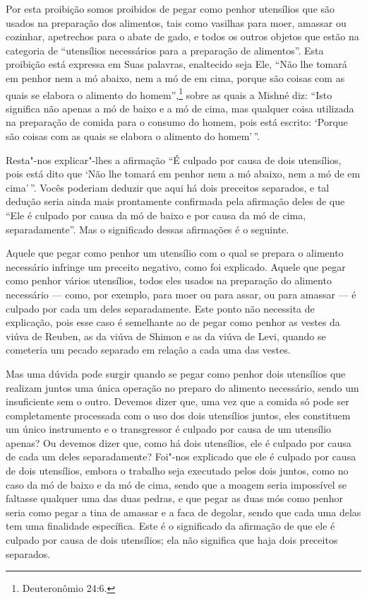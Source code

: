 \begin{multicols}{2}
Por esta proibição somos proibidos de pegar como penhor utensílios que
são usados na preparação dos alimentos, tais como vasilhas para moer,
amassar ou cozinhar, apetrechos para o abate de gado, e todos os outros
objetos que estão na categoria de ``utensílios necessários para a
preparação de alimentos''. Esta proibição está expressa em Suas
palavras, enaltecido seja Ele, ``Não lhe tomará em penhor nem a mó
abaixo, nem a mó de em cima, porque são coisas com as quais se elabora o
alimento do homem'',\footnote{Deuteronômio 24:6.} sobre as quais a Mishné diz:
``Isto significa não apenas a mó de baixo e a mó de cima, mas qualquer
coisa utilizada na preparação de comida para o consumo do homem, pois
está escrito: `Porque são coisas com as quais se elabora o alimento do
homem'\,''.

Resta"-nos explicar"-lhes a afirmação ``É culpado por causa de dois
utensílios, pois está dito que `Não lhe tomará em penhor nem a mó
abaixo, nem a mó de em cima'\,''. Vocês poderiam deduzir que aqui há dois
preceitos separados, e tal dedução seria ainda mais prontamente
confirmada pela afirmação deles de que ``Ele é culpado por causa da mó
de baixo e por causa da mó de cima, separadamente''. Mas o significado
dessas afirmações é o seguinte.

Aquele que pegar como penhor um utensílio com o qual se prepara o
alimento necessário infringe um preceito negativo, como foi explicado.
Aquele que pegar como penhor vários utensílios, todos eles usados na
preparação do alimento necessário --- como, por exemplo, para moer ou
para assar, ou para amassar --- é culpado por cada um deles
separadamente. Este ponto não necessita de explicação, pois esse caso é
semelhante ao de pegar como penhor as vestes da viúva de Reuben, as da
viúva de Shimon e as da viúva de Levi\starr, quando se cometeria um pecado
separado em relação a cada uma das vestes.

Mas uma dúvida pode surgir quando se pegar como penhor dois utensílios
que realizam juntos uma única operação no preparo do alimento
necessário, sendo um insuficiente sem o outro. Devemos dizer que, uma
vez que a comida só pode ser completamente processada com o uso dos
dois utensílios juntos, eles constituem um único instrumento e o
transgressor é culpado por causa de um utensílio apenas? Ou devemos
dizer que, como há dois utensílios, ele é culpado por causa de cada um
deles separadamente? Foi"-nos explicado que ele é culpado por causa de
dois utensílios, embora o trabalho seja executado pelos dois juntos,
como no caso da mó de baixo e da mó de cima, sendo que a moagem seria
impossível se faltasse qualquer uma das duas pedras, e que pegar as
duas mós como penhor seria como pegar a tina de amassar e a faca de
degolar, sendo que cada uma delas tem uma finalidade específica. Este é
o significado da afirmação de que ele é culpado por causa de dois
utensílios; ela não significa que haja dois preceitos separados.


\end{multicols}
